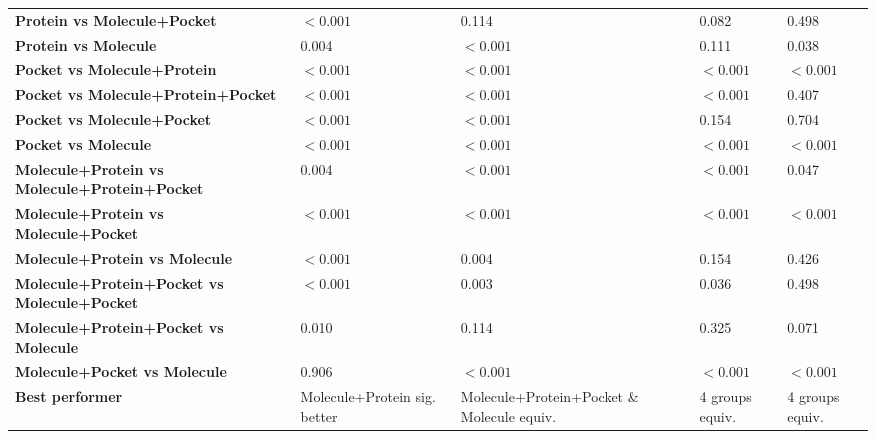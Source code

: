 \begin{table}[H]
{\begin{tabular}{lllll}
        \textbf{Protein vs Molecule+Pocket} & $< 0.001$ & 0.114 & 0.082 & 0.498 \\
        \textbf{Protein vs Molecule} & 0.004 & $< 0.001$ & 0.111 & 0.038 \\
        \textbf{Pocket vs Molecule+Protein} & $< 0.001$ & $< 0.001$ & $< 0.001$ & $< 0.001$ \\
        \textbf{Pocket vs Molecule+Protein+Pocket} & $< 0.001$ & $< 0.001$ & $< 0.001$ & 0.407 \\
        \textbf{Pocket vs Molecule+Pocket} & $< 0.001$ & $< 0.001$ & 0.154 & 0.704 \\
        \textbf{Pocket vs Molecule} & $< 0.001$ & $< 0.001$ & $< 0.001$ & $< 0.001$ \\
        \textbf{Molecule+Protein vs Molecule+Protein+Pocket} & 0.004 & $< 0.001$ & $< 0.001$ & 0.047 \\
        \textbf{Molecule+Protein vs Molecule+Pocket} & $< 0.001$ & $< 0.001$ & $< 0.001$ & $< 0.001$ \\
        \textbf{Molecule+Protein vs Molecule} & $< 0.001$ & 0.004 & 0.154 & 0.426 \\
        \textbf{Molecule+Protein+Pocket vs Molecule+Pocket} & $< 0.001$ & 0.003 & 0.036 & 0.498 \\
        \textbf{Molecule+Protein+Pocket vs Molecule} & 0.010 & 0.114 & 0.325 & 0.071 \\
        \textbf{Molecule+Pocket vs Molecule} & 0.906 & $< 0.001$ & $< 0.001$ & $< 0.001$ \\
        \textbf{Best performer} & Molecule+Protein sig. better & Molecule+Protein+Pocket \& Molecule equiv. & 4 groups equiv. & 4 groups equiv. \\
        \bottomrule
    \end{tabular}}
\end{table}